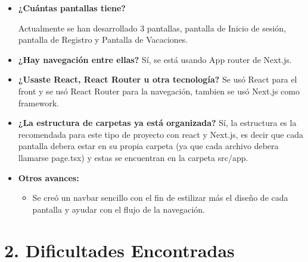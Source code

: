 \documentclass[12pt]{article}
\begin{document}
\begin{itemize}
  \item \textbf{¿Cuántas pantallas tiene?}
  
  Actualmente se han desarrollado 3 pantallas, pantalla de Inicio de sesión, pantalla de Registro y Pantalla de Vacaciones.
  \item \textbf{¿Hay navegación entre ellas?} Sí, se está usando App router de Next.js.
  \item \textbf{¿Usaste React, React Router u otra tecnología?} Se usó React para el front y se usó React Router para la navegación, tambien se usó Next.js como framework.
  \item \textbf{¿La estructura de carpetas ya está organizada?} Sí, la estructura es la recomendada para este tipo de proyecto con react y Next.js, es decir que cada pantalla debera estar en su propia carpeta (ya que cada archivo debera llamarse page.tsx) y estas se encuentran en la carpeta src/app.
  \item \textbf{Otros avances:} 
  \begin{itemize}
    \item Se creó un navbar sencillo con el fin de estilizar más el diseño de cada pantalla y ayudar con el flujo de la navegación.
  \end{itemize}
\end{itemize}

\section*{2. Dificultades Encontradas}
\end{document}
